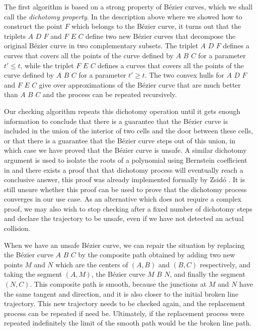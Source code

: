\documentclass{easychair}
\begin{document}
The first algorithm is based on a strong property of Bézier curves,
which we shall call the {\em dichotomy property}.  In the description above
where we showed how to construct the point \(F\) which belongs to
the Bézier curve, it turns out that the triplets \(A\) \(D\) \(F\) and
\(F\) \(E\) \(C\) define two new Bézier curves that decompose the
original Bézier curve in two complementary subsets.  The triplet
\(A\) \(D\) \(F\) defines a curves that
covers all the points of the curve defined by \(A\) \(B\) \(C\)
for a parameter \(t' \leq t\), while the triplet \(F\) \(E\) \(C\) 
defines a curves that covers all the points of the curve defined
by \(A\) \(B\) \(C\) for a parameter \(t'\geq t\).  The two convex
hulls for \(A\) \(D\) \(F\) and \(F\) \(E\) \(C\) 
give over approximations of the Bézier curve that are much better than
 \(A\) \(B\) \(C\) and the process can be repeated recursively.

Our checking
algorithm repeats this dichotomy operation until it gets enough
information to conclude that there is a guarantee that the Bézier curve
is included in the union of the interior of two cells and the door
between these cells, or that there is a guarantee that the Bézier curve
steps out of this union, in which case we have proved that the Bézier
curve is unsafe.  A similar dichotomy argument is used to isolate the
roots of a polynomial using Bernstein coefficient in
\cite{basu:hal-01083587} and there exists a proof that that dichotomy
process will eventually reach a conclusive answer, this proof was
already implemented formally by Zsid\'o \cite{Zsido2014}.  It is still
unsure whether this proof can be used to prove that the dichotomy
process converges in our use case.  As an alternative which does not
require a complex proof, we may also wish to stop checking after a
fixed number of dichotomy steps and declare the trajectory to be
unsafe, even if we have not detected an actual collision.

When we have an unsafe Bézier curve, we can repair the situation by
replacing the Bézier curve \(A\) \(B\) \(C\) by the composite path
obtained by adding two new points \(M\) and \(N\) which are the
centers of \((A,B)\) and \((B,C)\) respectively, and taking the
segment \((A,M)\), the Bézier curve \(M\) \(B\) \(N\), and finally the
segment \((N, C)\).  This composite path is smooth, because the
junctions at \(M\) and \(N\) have the same tangent and direction, and
it is also closer to the initial broken line trajectory.  
This new trajectory needs to be checked again,
and the replacement process can be repeated if need be.  Ultimately,
if the replacement process were repeated indefinitely the limit of the
smooth path would be the broken line path.
\end{document}
